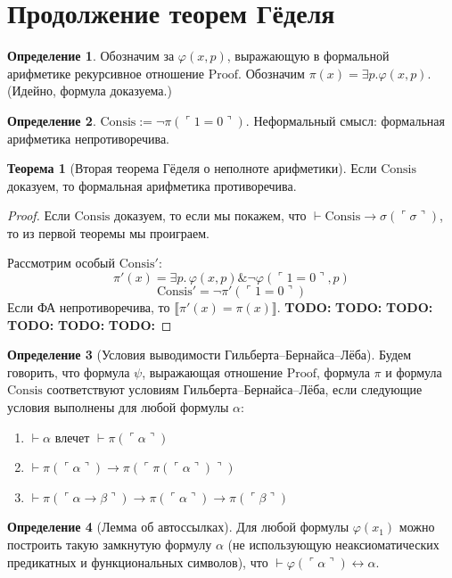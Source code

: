 \documentclass[a4paper,11pt]{article}
\theoremstyle{definition}
\newtheorem*{thm}{Теорема}
\newtheorem*{dfn}{Определение}
\newcommand{\proves}{\vdash}
\newcommand{\amp}{\mathbin{\&}}
\newcommand{\gn}[1]{\ulcorner #1 \urcorner}
\newcommand{\todo}[1]{\textbf{TODO:} #1}
\begin{document}
\section{Продолжение теорем Гёделя}
\begin{dfn}
Обозначим за $\varphi(x, p)$, выражающую в формальной арифметике рекурсивное
отношение $\mathrm{Proof}$. Обозначим $\pi(x) = \exists p.\varphi(x, p)$.
(Идейно, формула доказуема.)
\end{dfn}
\begin{dfn}
$\mathrm{Consis} := \neg\pi(\gn{1 = 0})$. Неформальный смысл: формальная
арифметика непротиворечива.
\end{dfn}
\begin{thm}[Вторая теорема Гёделя о неполноте арифметики]
Если $\mathrm{Consis}$ доказуем, то формальная арифметика противоречива.
\end{thm}
\begin{proof}
Если $\mathrm{Consis}$ доказуем, то если мы покажем, что $\proves \mathrm{Consis}
\to \sigma(\gn{\sigma})$, то из первой теоремы мы проиграем.

Рассмотрим особый $\mathrm{Consis}'$:
\[ \pi'(x) = \exists p.\,\varphi(x, p) \amp \neg\varphi(\gn{1 = 0}, p) \]
\[ \mathrm{Consis}' = \neg\pi'(\gn{1 = 0}) \]
Если ФА непротиворечива, то $\llbracket\pi'(x) = \pi(x)\rrbracket$.
\todo{} \todo{} \todo{} \todo{} \todo{} \todo{}
\end{proof}
\begin{dfn}[Условия выводимости Гильберта--Бернайса--Лёба]
Будем говорить, что формула $\psi$, выражающая отношение $\mathrm{Proof}$,
формула $\pi$ и формула $\mathrm{Consis}$ соответствуют условиям
Гильберта--Бернайса--Лёба, если следующие условия выполнены для любой формулы
$\alpha$:
\begin{enumerate}
\item $\proves \alpha$ влечет $\proves \pi(\gn{\alpha})$
\item $\proves \pi(\gn{\alpha}) \to \pi(\gn{\pi(\gn{\alpha})})$
\item $\proves \pi(\gn{\alpha \to \beta}) \to \pi(\gn{\alpha}) \to \pi(\gn{\beta})$
\end{enumerate}
\end{dfn}
\begin{dfn}[Лемма об автоссылках]
Для любой формулы $\varphi(x_1)$ можно построить такую замкнутую формулу
$\alpha$ (не использующую неаксиоматических предикатных и функциональных
символов), что $\proves \varphi(\gn{\alpha}) \leftrightarrow \alpha$.
\end{dfn}
\end{document}
